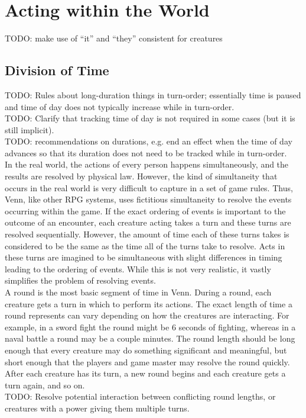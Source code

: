 \documentclass[letterpaper,titlepage,openany,twocolumn]{book}
\begin{document}
\chapter{Acting within the World}
TODO: make use of “it” and “they” consistent for creatures\\

\section{Division of Time}
TODO: Rules about long-duration things in turn-order; essentially time is paused and time of day does not typically increase while in turn-order.\\
TODO: Clarify that tracking time of day is not required in some cases (but it is still implicit).\\
TODO: recommendations on durations, e.g. end an effect when the time of day advances so that its duration does not need to be tracked while in turn-order.\\

In the real world, the actions of every person happens simultaneously, and the results are resolved by physical law. However, the kind of simultaneity that occurs in the real world is very difficult to capture in a set of game rules. Thus, Venn, like other RPG systems, uses fictitious simultaneity to resolve the events occurring within the game. If the exact ordering of events is important to the outcome of an encounter, each creature acting takes a turn and these turns are resolved sequentially. However, the amount of time each of these turns takes is considered to be the same as the time all of the turns take to resolve. Acts in these turns are imagined to be simultaneous with slight differences in timing leading to the ordering of events. While this is not very realistic, it vastly simplifies the problem of resolving events.\\

A round is the most basic segment of time in Venn. During a round, each creature gets a turn in which to perform its actions. The exact length of time a round represents can vary depending on how the creatures are interacting. For example, in a sword fight the round might be 6 seconds of fighting, whereas in a naval battle a round may be a couple minutes. The round length should be long enough that every creature may do something significant and meaningful, but short enough that the players and game master may resolve the round quickly. After each creature has its turn, a new round begins and each creature gets a turn again, and so on.\\
TODO: Resolve potential interaction between conflicting round lengths, or creatures with a power giving them multiple turns.\\
\end{document}
